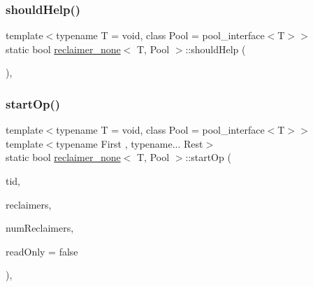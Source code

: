 \mbox{\label{classreclaimer__none_a0a343e289f2ec0bd11f565be7ba05f6c}} 
\subsubsection{\texorpdfstring{should\+Help()}{shouldHelp()}}
{\footnotesize\ttfamily template$<$typename T  = void, class Pool  = pool\+\_\+interface$<$\+T$>$$>$ \\
static bool \hyperlink{classreclaimer__none}{reclaimer\+\_\+none}$<$ T, Pool $>$\+::should\+Help (\begin{DoxyParamCaption}{ }\end{DoxyParamCaption})\hspace{0.3cm}{\ttfamily [inline]}, {\ttfamily [static]}}

\mbox{\label{classreclaimer__none_a320e4964cc7b800368b532b4a39c2457}} 
\subsubsection{\texorpdfstring{start\+Op()}{startOp()}}
{\footnotesize\ttfamily template$<$typename T  = void, class Pool  = pool\+\_\+interface$<$\+T$>$$>$ \\
template$<$typename First , typename... Rest$>$ \\
static bool \hyperlink{classreclaimer__none}{reclaimer\+\_\+none}$<$ T, Pool $>$\+::start\+Op (\begin{DoxyParamCaption}\item[{const int}]{tid,  }\item[{void $\ast$const $\ast$const}]{reclaimers,  }\item[{const int}]{num\+Reclaimers,  }\item[{const bool}]{read\+Only = {\ttfamily false} }\end{DoxyParamCaption})\hspace{0.3cm}{\ttfamily [inline]}, {\ttfamily [static]}}

\mbox{\label{classreclaimer__none_a29e0601d98d0325c7a10ebc6346746b7}} 
